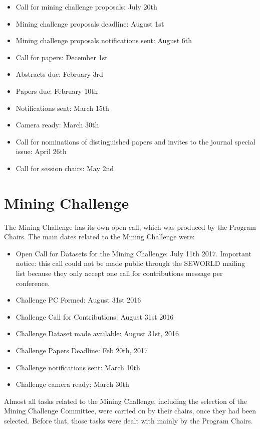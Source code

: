 \documentclass[a4paper]{report}
\begin{document}
\begin{itemize}
\item Call for mining challenge proposals: July 20th
\item Mining challenge proposals deadline: August 1st
\item Mining challenge proposals notifications sent: August 6th
\item Call for papers: December 1st
\item Abstracts due: February 3rd
\item Papers due: February 10th
\item Notifications sent: March 15th
\item Camera ready: March 30th
\item Call for nominations of distinguished papers and invites to the journal special issue: April 26th
\item Call for session chairs: May 2nd
\end{itemize}

\section{Mining Challenge}

The Mining Challenge has its own open call, which was produced by the Program Chairs. The main dates related to the Mining Challenge were:

\begin{itemize}
  \item Open Call for Datasets for the Mining Challenge: July 11th 2017. Important notice: this call could not be made public through the SEWORLD mailing list because they only accept one call for contributions message per conference.
  \item Challenge PC Formed: August 31st 2016
  \item Challenge Call for Contributions: August 31st 2016
  \item Challenge Dataset made available: August 31st, 2016
  \item Challenge Papers Deadline: Feb 20th, 2017
  \item Challenge notifications sent: March 10th
  \item Challenge camera ready: March 30th
\end{itemize}

Almost all tasks related to the Mining Challenge, including the selection of the Mining Challenge Committee, were carried on by their chairs, once they had been selected. Before that, those tasks were dealt with mainly by the Program Chairs.
\end{document}
